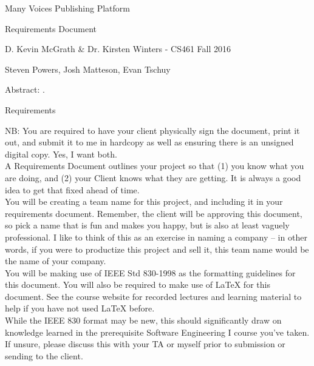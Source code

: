 \documentclass[letterpaper, 10pt, draftclsnofoot, onecolumn]{IEEEtran}
\begin{document}
\begin{titlepage}
\centering
{\huge Many Voices Publishing Platform\par}
{\LARGE Requirements Document\par}
{\vspace{2mm}}
{\large D. Kevin McGrath \& Dr. Kirsten Winters -  CS461 Fall 2016\par}
{\large Steven Powers, Josh Matteson, Evan Tschuy\par}
{\vspace{10mm}}
{\large Abstract: .\par}
\end{titlepage}

\vspace{1pc}
\centerline{\sc \large Requirements}
\vspace{2pc}

NB: You are required to have your client physically sign the document, print it out, and submit it to me in hardcopy as well as ensuring there is an unsigned digital copy. Yes, I want both. \\

A Requirements Document outlines your project so that (1) you know what you are doing, and (2) your Client knows what they are getting. It is always a good idea to get that fixed ahead of time. \\

You will be creating a team name for this project, and including it in your requirements document. Remember, the client will be approving this document, so pick a name that is fun and makes you happy, but is also at least vaguely professional. I like to think of this as an exercise in naming a company -- in other words, if you were to productize this project and sell it, this team name would be the name of your company. \\

You will be making use of IEEE Std 830-1998 as the formatting guidelines for this document. You will also be required to make use of LaTeX for this document. See the course website for recorded lectures and learning material to help if you have not used LaTeX before. \\

While the IEEE 830 format may be new, this should significantly draw on knowledge learned in the prerequisite Software Engineering I course you've taken. If unsure, please discuss this with your TA or myself prior to submission or sending to the client. \\
\end{document}
